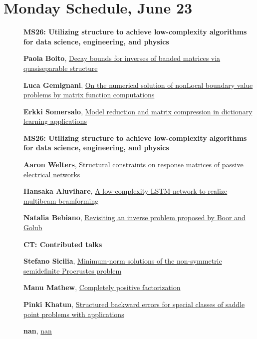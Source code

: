 \documentclass[ILAS2025-program.tex]{subfiles}
\begin{document}
\section*{Monday Schedule, June 23 }
        
        \begin{description}
    \item[] {\color{mstitle}\textbf{MS26: Utilizing structure to achieve low-complexity algorithms for data science, engineering, and physics}} 
    \item[] \hypertarget{up0025}{}\textbf{Paola Boito}, \hyperlink{down0025}{Decay bounds for inverses of banded matrices via quasiseparable structure}
        \item[] \hypertarget{up0026}{}\textbf{Luca Gemignani}, \hyperlink{down0026}{On the numerical solution of nonLocal boundary value problems by matrix function computations}
        \item[] \hypertarget{up0027}{}\textbf{Erkki Somersalo}, \hyperlink{down0027}{Model reduction and matrix compression in dictionary learning applications}
        \end{description}
    \begin{description}
    \item[] {\color{mstitle}\textbf{MS26: Utilizing structure to achieve low-complexity algorithms for data science, engineering, and physics}} 
    \item[] \hypertarget{up0058}{}\textbf{Aaron Welters}, \hyperlink{down0058}{Structural constraints on response matrices of passive electrical networks
}
        \item[] \hypertarget{up0059}{}\textbf{Hansaka Aluvihare}, \hyperlink{down0059}{A low-complexity LSTM network to realize multibeam beamforming
}
        \item[] \hypertarget{up0060}{}\textbf{Natalia Bebiano}, \hyperlink{down0060}{Revisiting an inverse problem proposed by Boor and Golub
}
        \end{description}
    \begin{description}
    \item[] {\color{mstitle}\textbf{CT: Contributed talks}} 
    \item[] \hypertarget{up0096}{}\textbf{Stefano Sicilia}, \hyperlink{down0096}{Minimum-norm solutions of the non-symmetric semidefinite Procrustes problem}
        \item[] \hypertarget{up0097}{}\textbf{Manu Mathew}, \hyperlink{down0097}{Completely positive factorization}
        \item[] \hypertarget{up0098}{}\textbf{Pinki Khatun}, \hyperlink{down0098}{Structured backward errors for special classes of saddle point problems with applications}
        \item[] \hypertarget{up0099}{}\textbf{nan}, \hyperlink{down0099}{nan}
        \end{description}
    \newpage
\end{document}
